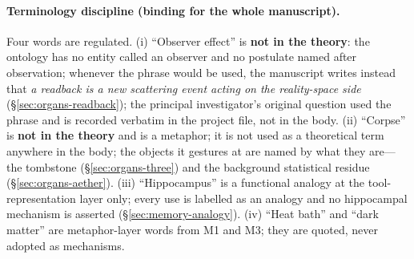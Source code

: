 \documentclass[11pt,a4paper]{article}
\begin{document}
\paragraph{Terminology discipline (binding for the whole manuscript).} Four words are regulated. (i) ``Observer effect'' is \textbf{not in the theory}: the ontology has no entity called an observer and no postulate named after observation; whenever the phrase would be used, the manuscript writes instead that \emph{a readback is a new scattering event acting on the reality-space side} (\S\ref{sec:organs-readback}); the principal investigator's original question used the phrase and is recorded verbatim in the project file, not in the body. (ii) ``Corpse'' is \textbf{not in the theory} and is a metaphor; it is not used as a theoretical term anywhere in the body; the objects it gestures at are named by what they are---the tombstone (\S\ref{sec:organs-three}) and the background statistical residue (\S\ref{sec:organs-aether}). (iii) ``Hippocampus'' is a functional analogy at the tool-representation layer only; every use is labelled as an analogy and no hippocampal mechanism is asserted (\S\ref{sec:memory-analogy}). (iv) ``Heat bath'' and ``dark matter'' are metaphor-layer words from M1 and M3; they are quoted, never adopted as mechanisms.
\end{document}
